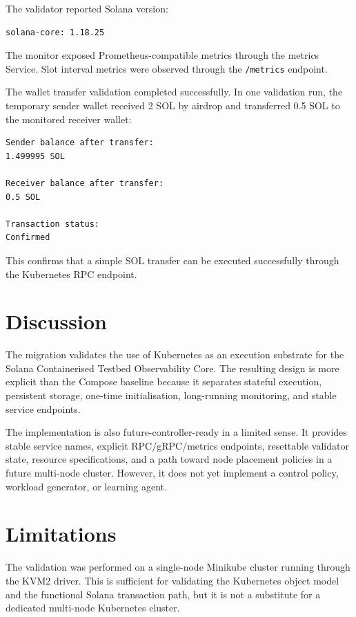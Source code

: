 \documentclass[11pt,a4paper]{article}
\begin{document}
The validator reported Solana version:

\begin{lstlisting}[style=terminal]
solana-core: 1.18.25
\end{lstlisting}

The monitor exposed Prometheus-compatible metrics through the metrics Service. Slot interval metrics were observed through the \texttt{/metrics} endpoint.

The wallet transfer validation completed successfully. In one validation run, the temporary sender wallet received 2 SOL by airdrop and transferred 0.5 SOL to the monitored receiver wallet:

\begin{lstlisting}[style=terminal]
Sender balance after transfer:
1.499995 SOL

Receiver balance after transfer:
0.5 SOL

Transaction status:
Confirmed
\end{lstlisting}

This confirms that a simple SOL transfer can be executed successfully through the Kubernetes RPC endpoint.

\section{Discussion}

The migration validates the use of Kubernetes as an execution substrate for the Solana Containerised Testbed Observability Core. The resulting design is more explicit than the Compose baseline because it separates stateful execution, persistent storage, one-time initialisation, long-running monitoring, and stable service endpoints.

The implementation is also future-controller-ready in a limited sense. It provides stable service names, explicit RPC/gRPC/metrics endpoints, resettable validator state, resource specifications, and a path toward node placement policies in a future multi-node cluster. However, it does not yet implement a control policy, workload generator, or learning agent.

\section{Limitations}

The validation was performed on a single-node Minikube cluster running through the KVM2 driver. This is sufficient for validating the Kubernetes object model and the functional Solana transaction path, but it is not a substitute for a dedicated multi-node Kubernetes cluster.
\end{document}
